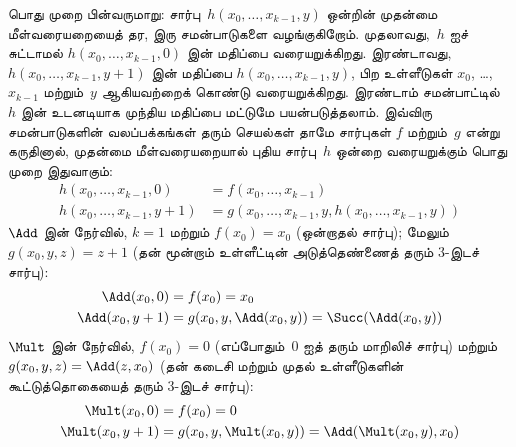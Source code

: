 \documentclass[../../../include/open-logic-section]{subfiles}
\begin{document}
பொது முறை பின்வருமாறு: சார்பு~$h(x_0, \dots, x_{k-1}, y)$
ஒன்றின் முதன்மை மீள்வரையறையைத் தர, இரு சமன்பாடுகளை வழங்குகிறோம்.
முதலாவது,~$h$ ஐச் சுட்டாமல் $h(x_0, \dots, x_{k-1}, 0)$ இன்
மதிப்பை வரையறுக்கிறது. இரண்டாவது, $h(x_0,
\dots, x_{k-1}, y+1)$ இன் மதிப்பை $h(x_0, \dots, x_{k-1}, y)$,
பிற உள்ளீடுகள் $x_0$, \dots,~$x_{k-1}$ மற்றும்~$y$ ஆகியவற்றைக்
கொண்டு வரையறுக்கிறது. இரண்டாம் சமன்பாட்டில்~$h$ இன் உடனடியாக
முந்திய மதிப்பை மட்டுமே பயன்படுத்தலாம். இவ்விரு சமன்பாடுகளின்
வலப்பக்கங்கள் தரும் செயல்கள் தாமே சார்புகள் $f$ மற்றும்~$g$
என்று கருதினால், முதன்மை மீள்வரையறையால் புதிய சார்பு~$h$ ஒன்றை
வரையறுக்கும் பொது முறை இதுவாகும்:
\begin{align*}
  h(x_0, \dots, x_{k-1}, 0) & = f(x_0, \dots, x_{k-1})\\
  h(x_0, \dots, x_{k-1}, y+1) & =
  g(x_0, \dots, x_{k-1}, y, h(x_0, \dots, x_{k-1}, y))
\end{align*}  
$\Add$ இன் நேர்வில், $k=1$ மற்றும் $f(x_0) = x_0$
(ஒன்றாதல் சார்பு); மேலும் $g(x_0, y, z) = z + 1$ (தன் மூன்றாம்
உள்ளீட்டின் அடுத்தெண்ணைத் தரும் $3$-இடச் சார்பு):
\begin{align*}
  \Add(x_0, 0) & = f(x_0) = x_0\\
  \Add(x_0, y+1) & = g(x_0, y, \Add(x_0, y)) =
  \Succ(\Add(x_0, y))
\end{align*}
$\Mult$ இன் நேர்வில், $f(x_0) = 0$ (எப்போதும்~$0$ ஐத் தரும்
மாறிலிச் சார்பு) மற்றும் $g(x_0, y, z) = \Add(z,x_0)$
(தன் கடைசி மற்றும் முதல் உள்ளீடுகளின் கூட்டுத்தொகையைத் தரும்
$3$-இடச் சார்பு):
\begin{align*}
  \Mult(x_0,0) & =  f(x_0) = 0 \\
  \Mult(x_0,y+1) & =  g(x_0, y, \Mult(x_0,y)) =
  \Add(\Mult(x_0,y), x_0)
\end{align*}
\end{document}
